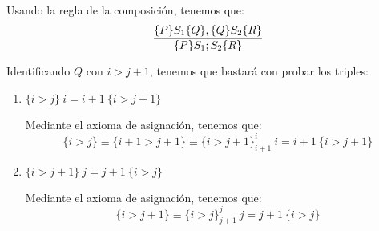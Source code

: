 \begin{ejercicio}
\begin{enumerate}
            Usando la regla de la composición, tenemos que:
            \begin{equation*}
                \dfrac{\{P\}S_1\{Q\}, \{Q\}S_2\{R\}}{\{P\}S_1;S_2\{R\}} \\
            \end{equation*}

            Identificando $Q$ con $i>j+1$, tenemos que bastará con probar los triples:
            \begin{enumerate}
                \item $\{i>j\}\ i=i+1\ \{i>j+1\}$
                
                Mediante el axioma de asignación, tenemos que:
                \begin{equation*}
                    \{i>j\} \equiv \{i+1>j+1\} \equiv \{i>j+1\}^i_{i+1}\ i=i+1\ \{i>j+1\}
                \end{equation*}

                \item $\{i>j+1\}\ j=j+1\ \{i>j\}$
                
                Mediante el axioma de asignación, tenemos que:
                \begin{equation*}
                    \{i>j+1\} \equiv \{i>j\}^j_{j+1}\ j=j+1\ \{i>j\}
                \end{equation*}
            \end{enumerate}


\end{enumerate}
\end{ejercicio}
